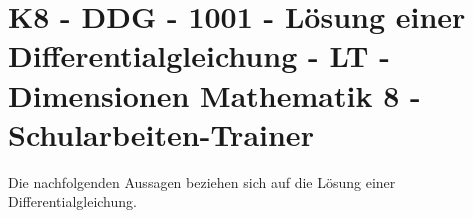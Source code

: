 \section{K8 - DDG - 1001 - Lösung einer Differentialgleichung - LT - Dimensionen Mathematik 8 - Schularbeiten-Trainer}

\begin{beispiel}[K8 - DDG]{1}
Die nachfolgenden Aussagen beziehen sich auf die Lösung einer Differentialgleichung.

\end{beispiel}